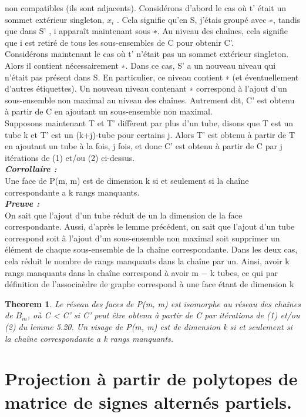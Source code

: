\documentclass{book}
\newtheorem{theorem}{Theorem}[section]
\begin{document}
non compatibles (ils sont adjacents).
Considérons d'abord le cas où t' était un sommet extérieur singleton, $x_i$
. Cela signifie qu'en S, j'étais
groupé avec ∗, tandis que dans S'
, {i} apparaît maintenant sous ∗. Au niveau des chaînes, cela signifie que i est
retiré de tous les sous-ensembles de C pour obtenir C'.\\
Considérons maintenant le cas où t' n'était pas un sommet extérieur singleton. Alors il contient nécessairement ∗.
Dans ce cas, S' a un nouveau niveau qui n'était pas présent dans S. En particulier, ce niveau contient ∗ (et
éventuellement d'autres étiquettes). Un nouveau niveau contenant ∗ correspond à l'ajout d'un sous-ensemble non maximal
au niveau des chaînes. Autrement dit, C'
est obtenu à partir de C en ajoutant un sous-ensemble non maximal.\\
Supposons maintenant T et T' diffèrent par plus d'un tube, disons que T est un tube k et T'
est un (k+j)-tube pour certains j. Alors T'
est obtenu à partir de T en ajoutant un tube à la fois, j fois, et donc C'
est obtenu à partir de C par j itérations de (1) et/ou (2) ci-dessus.\\
\textbf{\textit{Corrollaire :}}\\
Une face de P(m, m) est de dimension k si et seulement si la chaîne correspondante a
k rangs manquants.\\
\textbf{\textit{Preuve :}}\\
On sait que l'ajout d'un tube réduit de un la dimension de la face correspondante. Aussi,
d'après le lemme précédent, on sait que l'ajout d'un tube correspond soit à l'ajout d'un sous-ensemble non maximal soit
supprimer un élément de chaque sous-ensemble de la chaîne correspondante. Dans les deux cas, cela réduit le
nombre de rangs manquants dans la chaîne par un. Ainsi, avoir k rangs manquants dans la chaîne correspond
à avoir m − k tubes, ce qui par définition de l'associaèdre de graphe correspond à une face étant
de dimension k
\begin{theorem}
  Le réseau des faces de P(m, m) est isomorphe au réseau des chaînes de $B_m$, où
C < C'
si C'
peut être obtenu à partir de C par itérations de (1) et/ou (2) du lemme 5.20. Un visage de
P(m, m) est de dimension k si et seulement si la chaîne correspondante a k rangs manquants.
\end{theorem}

\chapter{Projection à partir de polytopes de matrice de signes alternés partiels.}
\end{document}
